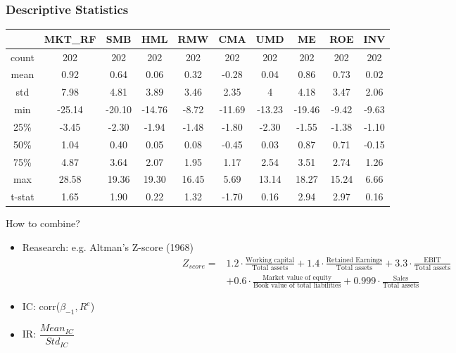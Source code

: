 \documentclass[aspectratio=169,11pt]{beamer}
\begin{document}
    \begin{frame}
        \frametitle{Descriptive Statistics}
        \centering
        \begin{tabulary}{\linewidth}{cccccccccc}
            \toprule
            \toprule
            &\textbf{MKT\_RF}& \textbf{SMB}& \textbf{HML}& \textbf{RMW}& \textbf{CMA}& \textbf{UMD}& \textbf{ME}& \textbf{ROE}& \textbf{INV}\\
            \midrule
            count& 202& 202& 202& 202& 202& 202 &202& 202& 202\\
            mean& 0.92& 0.64& 0.06& 0.32& -0.28& 0.04& 0.86& 0.73& 0.02\\
            std& 7.98 &4.81 &3.89 &3.46 &2.35& 4 &4.18& 3.47 &2.06\\
            min& -25.14& -20.10& -14.76& -8.72 &-11.69& -13.23 &-19.46 &-9.42& -9.63\\
            25\% &-3.45& -2.30 &-1.94& -1.48 &-1.80 &-2.30 &-1.55 &-1.38 &-1.10\\
            50\%& 1.04& 0.40& 0.05& 0.08& -0.45& 0.03& 0.87 &0.71 &-0.15\\
            75\% &4.87& 3.64& 2.07& 1.95 &1.17 &2.54 &3.51 &2.74 &1.26\\
            max &28.58 &19.36& 19.30 &16.45 &5.69 &13.14& 18.27& 15.24& 6.66\\
            t-stat& 1.65 &1.90& 0.22 &1.32 &-1.70 &0.16 &\alert{2.94} &\alert{2.97}& 0.16\\
            \bottomrule
            \bottomrule
        \end{tabulary}
    \end{frame}
    
    \begin{frame}{How to combine?}
        \begin{itemize}
            \item Reasearch: e.g. Altman's Z-score (1968)
            \begin{align*}
                Z_{score}=&1.2\cdot\frac{\text{Working capital}}{\text{Total assets}}+1.4\cdot\frac{\text{Retained Earnings}}{\text{Total assets}}+3.3\cdot\frac{\text{EBIT}}{\text{Total assets}}\\
                &+0.6\cdot\frac{\text{Market value of equity}}{\text{Book value of total liabilities}}+0.999\cdot\frac{\text{Sales}}{\text{Total assets}}
            \end{align*}
            \item IC: corr(\(\beta_{-1}, R^e\))
            \item IR: \(\dfrac{Mean_{IC}}{Std_{IC}}\)
        \end{itemize}
    \end{frame}
\end{document}
